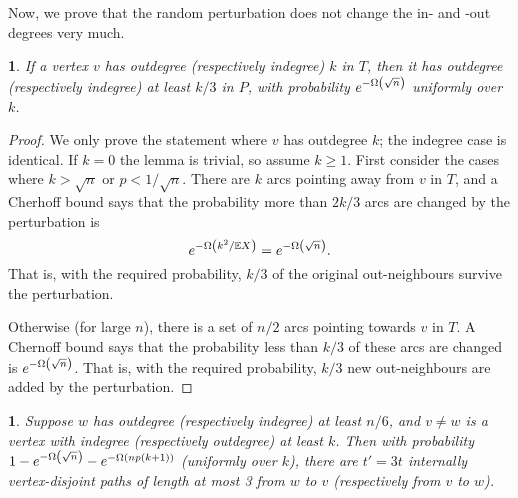 \documentclass[11pt,english]{article}
\theoremstyle{plain}
\theoremstyle{definition}
\theoremstyle{definition}
\theoremstyle{plain}
\theoremstyle{plain}
\theoremstyle{plain}
\newtheorem{lem}[thm]{\protect\lemmaname}
\theoremstyle{plain}
\theoremstyle{remark}
\theoremstyle{remark}
\let\originalleft\left
\let\originalright\right
\renewcommand{\left}{\mathopen{}\mathclose\bgroup\originalleft}
\renewcommand{\right}{\aftergroup\egroup\originalright}
\providecommand{\lemmaname}{Lemma}
\begin{document}
Now, we prove that the random perturbation does not change the in-
and -out degrees very much.
\begin{lem}
\label{lem:preserve-degree}If a vertex $v$ has outdegree (respectively
indegree) $k$ in $T$, then it has outdegree (respectively indegree)
at least $k/3$ in $P$, with probability $e^{-\Omega\left(\sqrt{n}\right)}$
uniformly over $k$.\end{lem}
\begin{proof}
We only prove the statement where $v$ has outdegree $k$; the indegree
case is identical. If $k=0$ the lemma is trivial, so assume $k\ge1$.
First consider the cases where $k>\sqrt{n}$ or $p<1/\sqrt{n}$. There
are $k$ arcs pointing away from $v$ in $T$, and a Cherhoff bound
says that the probability more than $2k/3$ arcs are changed by the
perturbation is
\[
e^{-\Omega\left(k^{2}/\E X\right)}=e^{-\Omega\left(\sqrt{n}\right)}.
\]
That is, with the required probability, $k/3$ of the original out-neighbours
survive the perturbation.

Otherwise (for large $n$), there is a set of $n/2$ arcs pointing
towards $v$ in $T$. A Chernoff bound says that the probability less
than $k/3$ of these arcs are changed is $e^{-\Omega\left(\sqrt{n}\right)}$.
That is, with the required probability, $k/3$ new out-neighbours
are added by the perturbation.\end{proof}
\begin{lem}
\label{lem:path-from-home}Suppose $w$ has outdegree (respectively
indegree) at least $n/6$, and $v\ne w$ is a vertex with indegree
(respectively outdegree) at least $k$. Then with probability $1-e^{-\Omega\left(\sqrt{n}\right)}-e^{-\Omega\left(np\left(k+1\right)\right)}$
(uniformly over $k$), there are $t'=3t$ internally vertex-disjoint
paths of length at most 3 from $w$ to $v$ (respectively from $v$
to $w$).\end{lem}
\end{document}
